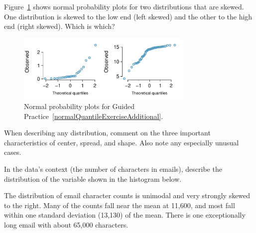 \begin{exercisewrap}
\begin{nexercise} \label{normalQuantileExerciseAdditional}
Figure~\ref{normalQuantileExerAdditional} shows normal probability plots for two distributions that are skewed. One distribution is skewed to the low end (left skewed) and the other to the high end (right skewed). Which is which?\footnotemark
\end{nexercise}
\end{exercisewrap}

\begin{figure}[h]
\centering
\includegraphics[width=0.75\textwidth]{ch_distributions/figures/normalQuantileExer/normalQuantileExerAdditional}
\caption{Normal probability plots for Guided Practice~\ref{normalQuantileExerciseAdditional}.}
\label{normalQuantileExerAdditional}
\end{figure}






When describing any distribution, comment on the three important characteristics of center, spread, and shape. Also note any especially unusual cases.


\begin{examplewrap}
\begin{nexample}{In the data's context (the number of characters in emails), describe the distribution of the  variable shown in the histogram below.
  \begin{center}
  \end{center}}
The distribution of email character counts is unimodal and very strongly skewed to the right. Many of the counts fall near the mean at 11,600, and most fall within one standard deviation (13,130) of the mean. There is one exceptionally long email with about 65,000 characters.



\end{nexample}
\end{examplewrap}

